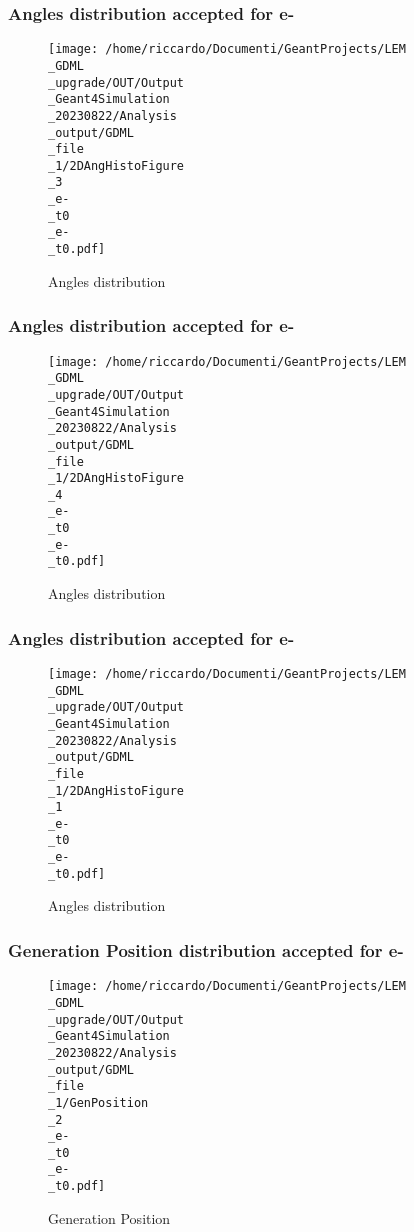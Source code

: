 \documentclass[8pt]{beamer}
\begin{document}
            \begin{frame}
                \frametitle{Angles distribution accepted for e-}
            
        \begin{figure}[h]
            \centering
            \texttt{[image: /home/riccardo/Documenti/GeantProjects/LEM\\\_GDML\\\_upgrade/OUT/Output\\\_Geant4Simulation\\\_20230822/Analysis\\\_output/GDML\\\_file\\\_1/2DAngHistoFigure\\\_3\\\_e-\\\_t0\\\_e-\\\_t0.pdf]}
            \caption{Angles distribution}
        \end{figure}
        
            \end{frame}
            
            \begin{frame}
                \frametitle{Angles distribution accepted for e-}
            
        \begin{figure}[h]
            \centering
            \texttt{[image: /home/riccardo/Documenti/GeantProjects/LEM\\\_GDML\\\_upgrade/OUT/Output\\\_Geant4Simulation\\\_20230822/Analysis\\\_output/GDML\\\_file\\\_1/2DAngHistoFigure\\\_4\\\_e-\\\_t0\\\_e-\\\_t0.pdf]}
            \caption{Angles distribution}
        \end{figure}
        
            \end{frame}
            
            \begin{frame}
                \frametitle{Angles distribution accepted for e-}
            
        \begin{figure}[h]
            \centering
            \texttt{[image: /home/riccardo/Documenti/GeantProjects/LEM\\\_GDML\\\_upgrade/OUT/Output\\\_Geant4Simulation\\\_20230822/Analysis\\\_output/GDML\\\_file\\\_1/2DAngHistoFigure\\\_1\\\_e-\\\_t0\\\_e-\\\_t0.pdf]}
            \caption{Angles distribution}
        \end{figure}
        
            \end{frame}
            
            \begin{frame}
                \frametitle{Generation Position distribution accepted for e-}
            
        \begin{figure}[h]
            \centering
            \texttt{[image: /home/riccardo/Documenti/GeantProjects/LEM\\\_GDML\\\_upgrade/OUT/Output\\\_Geant4Simulation\\\_20230822/Analysis\\\_output/GDML\\\_file\\\_1/GenPosition\\\_2\\\_e-\\\_t0\\\_e-\\\_t0.pdf]}
            \caption{Generation Position}
        \end{figure}
        
            \end{frame}
            
\end{document}

